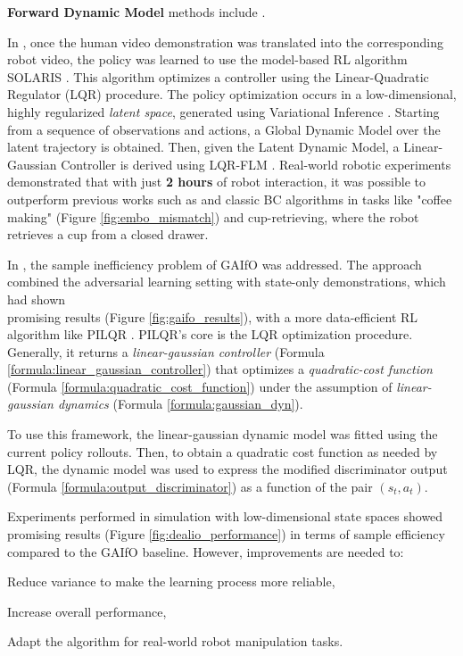 

\textbf{Forward Dynamic Model} methods include \cite{smith2019avid,torabi2021dealio}.

In \cite{smith2019avid}, once the human video demonstration was translated into the corresponding robot video, the policy was learned to use the model-based RL algorithm SOLARIS \cite{zhang2019solar}. This algorithm optimizes a controller using the Linear-Quadratic Regulator (LQR) procedure. The policy optimization occurs in a low-dimensional, highly regularized \textit{latent space}, generated using Variational Inference \cite{Kingma2014_vae}. Starting from a sequence of observations and actions, a Global Dynamic Model over the latent trajectory is obtained. Then, given the Latent Dynamic Model, a Linear-Gaussian Controller is derived using LQR-FLM \cite{levine2014lqr_flm}. Real-world robotic experiments demonstrated that with just \textbf{2 hours} of robot interaction, it was possible to outperform previous works such as \cite{sermanet2018time_contrastive,torabi2018bco} and classic BC algorithms in tasks like "coffee making" (Figure \ref{fig:embo_mismatch}) and cup-retrieving, where the robot retrieves a cup from a closed drawer.

In \cite{torabi2021dealio}, the sample inefficiency problem of GAIfO \cite{torabi2018gaifo} was addressed. The approach combined the adversarial learning setting with state-only demonstrations, which had shown \\ promising results (Figure \ref{fig:gaifo_results}), with a more data-efficient RL algorithm like PILQR \cite{chebotar2017pilqr}. PILQR's core is the LQR optimization procedure. Generally, it returns a \textit{linear-gaussian controller} (Formula \ref{formula:linear_gaussian_controller}) that optimizes a \textit{quadratic-cost function} (Formula \ref{formula:quadratic_cost_function}) under the assumption of \textit{linear-gaussian dynamics} (Formula \ref{formula:gaussian_dyn}).



To use this framework, the linear-gaussian dynamic model was fitted using the current policy rollouts. Then, to obtain a quadratic cost function as needed by LQR, the dynamic model was used to express the modified discriminator output (Formula \ref{formula:output_discriminator}) as a function of the pair $(s_{t}, a_{t})$.



Experiments performed in simulation with low-dimensional state spaces showed promising results (Figure \ref{fig:dealio_performance}) in terms of sample efficiency compared to the GAIfO baseline. However, improvements are needed to:
\begin{enumerate*}[label=\textbf{(\arabic*)}]
    \item Reduce variance to make the learning process more reliable,
    \item Increase overall performance,
    \item Adapt the algorithm for real-world robot manipulation tasks.
\end{enumerate*}

